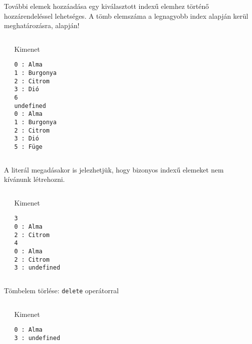 \begin{frame}[fragile]
  További elemek hozzáadása egy kiválasztott indexű elemhez történő hozzárendeléssel lehetséges. A tömb elemszáma a legnagyobb index alapján kerül meghatározásra,  alapján!
  \footnotesize
  \begin{columns}[T]
      \begin{exampleblock}{}
        
      \end{exampleblock}
      \begin{block}{Kimenet}
        \vspace{-0.3cm}
        \begin{verbatim}
0 : Alma
1 : Burgonya
2 : Citrom
3 : Dió
6
undefined
0 : Alma
1 : Burgonya
2 : Citrom
3 : Dió
5 : Füge
\end{verbatim}
      \vspace{-0.3cm}
      \end{block}
  \end{columns}
\end{frame}

\begin{frame}[fragile]
  A literál megadásakor is jelezhetjük, hogy bizonyos indexű elemeket nem kívánunk létrehozni.
  \small
  \begin{columns}[T]
      \begin{exampleblock}{}
        
      \end{exampleblock}
      \begin{block}{Kimenet}
        \begin{verbatim}
3
0 : Alma
2 : Citrom
4
0 : Alma
2 : Citrom
3 : undefined
\end{verbatim}
      \end{block}
  \end{columns}
\end{frame}

\begin{frame}[fragile]
  Tömbelem törlése: \texttt{delete} operátorral
  \vfill
  \small
  \begin{columns}[T]
      \begin{exampleblock}{}
        
      \end{exampleblock}
      \begin{block}{Kimenet}
        \begin{verbatim}
0 : Alma
3 : undefined
\end{verbatim}
      \end{block}
  \end{columns}
\end{frame}

